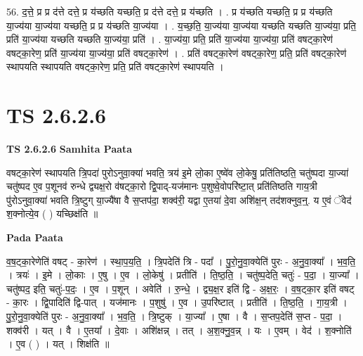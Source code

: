 \documentclass[17pt]{extarticle}
\begin{document}
56. द॒त्ते॒ प्र प्र द॑त्ते दत्ते॒ प्र य॑च्छति यच्छति॒ प्र द॑त्ते दत्ते॒ प्र य॑च्छति । . प्र य॑च्छति यच्छति॒ प्र प्र य॑च्छति या॒ज्य॑या या॒ज्य॑या यच्छति॒ प्र प्र य॑च्छति या॒ज्य॑या । . य॒च्छ॒ति॒ या॒ज्य॑या या॒ज्य॑या यच्छति यच्छति या॒ज्य॑या॒ प्रति॒ प्रति॑ या॒ज्य॑या यच्छति यच्छति या॒ज्य॑या॒ प्रति॑ । . या॒ज्य॑या॒ प्रति॒ प्रति॑ या॒ज्य॑या या॒ज्य॑या॒ प्रति॑ वषट्का॒रेण॑ वषट्का॒रेण॒ प्रति॑ या॒ज्य॑या या॒ज्य॑या॒ प्रति॑ वषट्का॒रेण॑ । . प्रति॑ वषट्का॒रेण॑ वषट्का॒रेण॒ प्रति॒ प्रति॑ वषट्का॒रेण॑ स्थापयति स्थापयति वषट्का॒रेण॒ प्रति॒ प्रति॑ वषट्का॒रेण॑ स्थापयति । \newline
\pagebreak
{}

\section{ TS 2.6.2.6 }

\textbf{TS 2.6.2.6 } \newline
\textbf{Samhita Paata} \newline

वषट्का॒रेण॑ स्थापयति त्रि॒पदा॑ पुरोऽनुवा॒क्या॑ भवति॒ त्रय॑ इ॒मे लो॒का ए॒ष्वे॑व लो॒केषु॒ प्रति॑तिष्ठति॒ चतु॑ष्पदा या॒ज्या॑ चतु॑ष्पद ए॒व प॒शूनव॑ रुन्धे द्व्यक्ष॒रो व॑षट्का॒रो द्वि॒पाद्-यज॑मानः प॒शुष्वे॒वोपरि॑ष्टा॒त् प्रति॑तिष्ठति गाय॒त्री पु॑रोऽनुवा॒क्या॑ भवति त्रि॒ष्टुग् या॒ज्यै॑षा वै स॒प्तप॑दा॒ शक्व॑री॒ यद्वा ए॒तया॑ दे॒वा अशि॑क्ष॒न् तद॑शक्नुव॒न्॒. य ए॒वं ॅवेद॑ श॒क्नोत्ये॒व ( ) यच्छिक्ष॑ति ॥ \newline

\textbf{Pada Paata} \newline

व॒ष॒ट्का॒रेणेति॑ वषट् - का॒रेण॑ । स्था॒प॒य॒ति॒ । त्रि॒पदेति॑ त्रि - पदा᳚ । पु॒रो॒नु॒वा॒क्येति॑ पुरः - अ॒नु॒वा॒क्या᳚ । भ॒व॒ति॒ । त्रयः॑ । इ॒मे । लो॒काः । ए॒षु । ए॒व । लो॒केषु॑ । प्रतीति॑ । ति॒ष्ठ॒ति॒ । चतु॑ष्प॒देति॒ चतुः॑ - प॒दा॒ । या॒ज्या᳚ । चतु॑ष्पद॒ इति॒ चतुः॑-प॒दः॒ । ए॒व । प॒शून् । अवेति॑ । रु॒न्धे॒ । द्व्य॒क्ष॒र इति॑ द्वि - अ॒क्ष॒रः॒ । व॒ष॒ट्का॒र इति॑ वषट् - का॒रः । द्वि॒पादिति॑ द्वि-पात् । यज॑मानः । प॒शुषु॑ । ए॒व । उ॒परि॑ष्टात् । प्रतीति॑ । ति॒ष्ठ॒ति॒ । गा॒य॒त्री । पु॒रो॒नु॒वा॒क्येति॑ पुरः - अ॒नु॒वा॒क्या᳚ । भ॒व॒ति॒ । त्रि॒ष्टुक् । या॒ज्या᳚ । ए॒षा । वै । स॒प्तप॒देति॑ स॒प्त - प॒दा॒ । शक्व॑री । यत् । वै । ए॒तया᳚ । दे॒वाः । अशि॑क्षन्न् । तत् । अ॒श॒क्नु॒व॒न्न् । यः । ए॒वम् । वेद॑ । श॒क्नोति॑ । ए॒व ( ) । यत् । शिक्ष॑ति ॥  \newline
\end{document}
